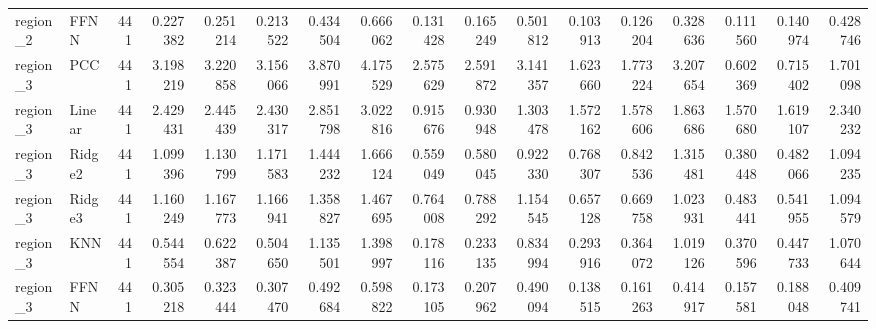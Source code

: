 \begin{tabular}{llrrrrrrrrrrrrrrr}
region_2 & FFNN & 441 & 0.227382 & 0.251214 & 0.213522 & 0.434504 & 0.666062 & 0.131428 & 0.165249 & 0.501812 & 0.103913 & 0.126204 & 0.328636 & 0.111560 & 0.140974 & 0.428746 \\
region_3 & PCC & 441 & 3.198219 & 3.220858 & 3.156066 & 3.870991 & 4.175529 & 2.575629 & 2.591872 & 3.141357 & 1.623660 & 1.773224 & 3.207654 & 0.602369 & 0.715402 & 1.701098 \\
region_3 & Linear & 441 & 2.429431 & 2.445439 & 2.430317 & 2.851798 & 3.022816 & 0.915676 & 0.930948 & 1.303478 & 1.572162 & 1.578606 & 1.863686 & 1.570680 & 1.619107 & 2.340232 \\
region_3 & Ridge2 & 441 & 1.099396 & 1.130799 & 1.171583 & 1.444232 & 1.666124 & 0.559049 & 0.580045 & 0.922330 & 0.768307 & 0.842536 & 1.315481 & 0.380448 & 0.482066 & 1.094235 \\
region_3 & Ridge3 & 441 & 1.160249 & 1.167773 & 1.166941 & 1.358827 & 1.467695 & 0.764008 & 0.788292 & 1.154545 & 0.657128 & 0.669758 & 1.023931 & 0.483441 & 0.541955 & 1.094579 \\
region_3 & KNN & 441 & 0.544554 & 0.622387 & 0.504650 & 1.135501 & 1.398997 & 0.178116 & 0.233135 & 0.834994 & 0.293916 & 0.364072 & 1.019126 & 0.370596 & 0.447733 & 1.070644 \\
region_3 & FFNN & 441 & 0.305218 & 0.323444 & 0.307470 & 0.492684 & 0.598822 & 0.173105 & 0.207962 & 0.490094 & 0.138515 & 0.161263 & 0.414917 & 0.157581 & 0.188048 & 0.409741 \\
\bottomrule
\end{tabular}

